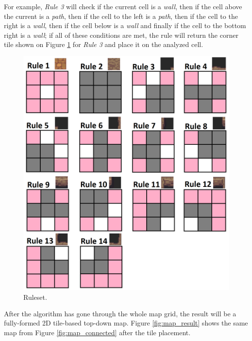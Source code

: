 For example, \emph{Rule 3} will check if the current cell is a \emph{wall}, then if the cell above the current is a \emph{path}, then if the cell to the left is a \emph{path}, then if the cell to the right is a \emph{wall}, then if the cell below is a \emph{wall} and finally if the cell to the bottom right is a \emph{wall}; if all of these conditions are met, the rule will return the corner tile shown on Figure \ref{fig:ruleset} for \emph{Rule 3} and place it on the analyzed cell.

\begin{figure}[h]
    \caption{Ruleset.}
    \centerline{\includegraphics[width=12cm]{images/development/morph_rules.png}}
    \label{fig:ruleset}
\end{figure}

After the algorithm has gone through the whole map grid, the result will be a fully-formed 2D tile-based top-down map. Figure \ref{fig:map_result} shows the same map from Figure \ref{fig:map_connected} after the tile placement.

